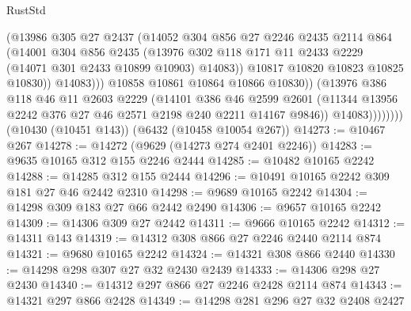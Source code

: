 \begin{lexlean}{RustStd}
\begin{coremodule}
                            (@13986
                              @305
                              @27
                              @2437
                              (@14052
                                @304
                                @856
                                @27
                                @2246
                                @2435
                                @2114
                                @864
                                (@14001
                                  @304
                                  @856
                                  @2435
                                  (@13976
                                    @302
                                    @118
                                    @171
                                    @11
                                    @2433
                                    @2229
                                    (@14071 @301 @2433 @10899 @10903)
                                    @14083))
                                @10817
                                @10820
                                @10823
                                @10825
                                @10830))
                            @14083)))
                      @10858
                      @10861
                      @10864
                      @10866
                      @10830))
                  (@13976
                    @386
                    @118
                    @46
                    @11
                    @2603
                    @2229
                    (@14101
                      @386
                      @46
                      @2599
                      @2601
                      (@11344 @13956 @2242 @376 @27 @46 @2571 @2198 @240 @2211 @14167 @9846))
                    @14083))))))))
    (@10430 (@10451 @143))
    (@6432 (@10458 @10054 @267))
@14273 := @10467 @267
@14278 := @14272 (@9629 (@14273 @274 @2401 @2246))
@14283 := @9635 @10165 @312 @155 @2246 @2444
@14285 := @10482 @10165 @2242
@14288 := @14285 @312 @155 @2444
@14296 := @10491 @10165 @2242 @309 @181 @27 @46 @2442 @2310
@14298 := @9689 @10165 @2242
@14304 := @14298 @309 @183 @27 @66 @2442 @2490
@14306 := @9657 @10165 @2242
@14309 := @14306 @309 @27 @2442
@14311 := @9666 @10165 @2242
@14312 := @14311 @143
@14319 := @14312 @308 @866 @27 @2246 @2440 @2114 @874
@14321 := @9680 @10165 @2242
@14324 := @14321 @308 @866 @2440
@14330 := @14298 @298 @307 @27 @32 @2430 @2439
@14333 := @14306 @298 @27 @2430
@14340 := @14312 @297 @866 @27 @2246 @2428 @2114 @874
@14343 := @14321 @297 @866 @2428
@14349 := @14298 @281 @296 @27 @32 @2408 @2427

\end{coremodule}
\end{lexlean}
